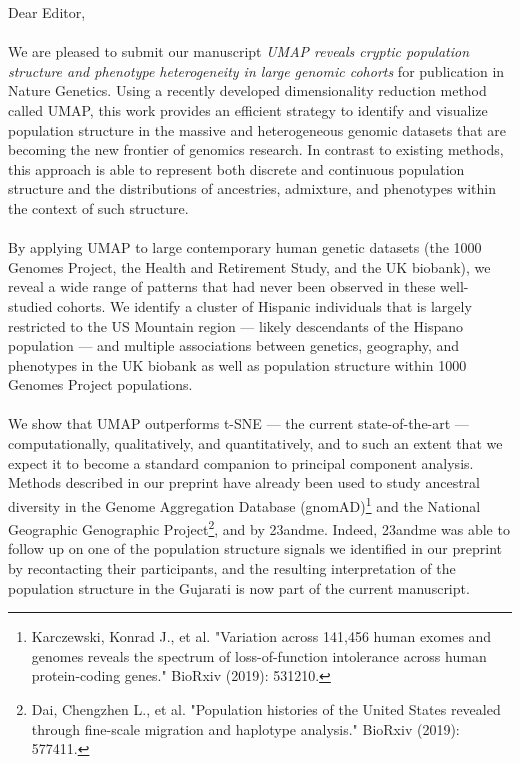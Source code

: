 \documentclass{article}
\begin{document}
Dear Editor,
\\\\
We are pleased to submit our manuscript \emph{UMAP reveals cryptic population structure and phenotype heterogeneity in large genomic cohorts} for publication in Nature Genetics. Using a recently developed dimensionality reduction method called UMAP, this work provides an efficient strategy to identify and visualize population structure in the massive and heterogeneous genomic datasets that are becoming the new frontier of genomics research. In contrast to existing methods, this approach is able to represent both discrete and continuous population structure and the distributions of ancestries, admixture, and phenotypes within the context of such structure. \\\\
By applying UMAP to large contemporary human genetic datasets (the 1000 Genomes Project, the Health and Retirement Study, and the UK biobank), we reveal a wide range of patterns that had never been observed in these well-studied cohorts. We identify a cluster of Hispanic individuals that is largely restricted to the US Mountain region --- likely descendants of the Hispano population --- and  multiple associations between genetics, geography, and phenotypes in the UK biobank as well as population structure within 1000 Genomes Project populations.
\\\\
We show that UMAP outperforms t-SNE --- the current state-of-the-art --- computationally, qualitatively, and quantitatively, and to such an extent that we expect it to become a standard companion to principal component analysis.
Methods described in our preprint have already been used to study ancestral diversity in the Genome Aggregation Database (gnomAD)\footnote{Karczewski, Konrad J., et al. "Variation across 141,456 human exomes and genomes reveals the spectrum of loss-of-function intolerance across human protein-coding genes." BioRxiv (2019): 531210.} and the National Geographic Genographic Project\footnote{Dai, Chengzhen L., et al. "Population histories of the United States revealed through fine-scale migration and haplotype analysis." BioRxiv (2019): 577411.}, and by 23andme. Indeed, 23andme was able to follow up on one of the population structure signals we identified in our preprint by recontacting their participants, and the resulting interpretation of the population structure in the Gujarati is now part of the current manuscript. 
\end{document}
